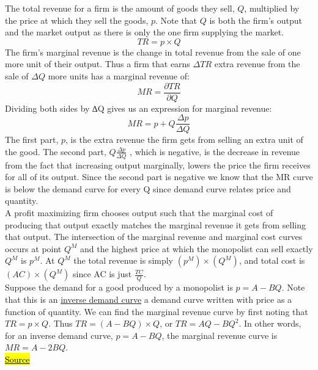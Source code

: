 \documentclass[a4paper, 12pt, reqno]{article}
\begin{document}
The total revenue for a firm is the amount of goods they sell, $Q$, multiplied by the price at which they sell the goods, $p$. Note that $Q$ is both the firm’s output and the market output as there is only the one firm supplying the market. 
$$ TR = p\times Q$$
The firm’s marginal revenue is the change in total revenue from the sale of one more unit of their output. Thus a firm that earns $\Delta TR$ extra revenue from the sale of $\Delta Q$ more units has a marginal revenue of: 
$$MR = \frac{\partial TR}{\partial Q}$$
Dividing both sides by ∆Q gives us an expression for marginal revenue:
$$MR= p+Q\frac{\Delta p}{\Delta Q}$$
The first part, $p$, is the extra revenue the firm gets from selling an extra unit of the good. The second part, $Q\frac{\Delta p}{\Delta Q}$ , which is negative, is the decrease in revenue from the fact that increasing output marginally, 
lowers the price the firm receives for all of its output. Since the second part is negative we know that the MR curve is below the demand curve for every Q since demand curve relates price and quantity. \\

A profit maximizing firm chooses output such that the marginal cost of producing that output exactly matches the marginal revenue it gets from selling that output. The intersection of the marginal revenue and marginal cost curves occurs at point $Q^M $ and the highest price at which the monopolist can sell exactly $Q^M $ is $p^M $. 
At $Q^M $ the total revenue is simply $(p^M ) \times (Q^M )$, and total cost is $(AC) \times (Q^M )$ since AC is just $\frac{TC}{Q}$. \\

Suppose the demand for a good produced by a monopolist is $p = A - BQ$. Note that this is an \underline{inverse demand curve} a demand curve written with price as a function of quantity. We can find the marginal revenue curve by first noting that $TR = p \times Q$. 
Thus $TR = (A - BQ) \times Q$, or $TR = AQ - BQ^{2}$. 
In other words, for an inverse demand curve, $p = A - BQ$, the marginal revenue curve is $MR = A - 2BQ$. \\

\href{https://open.oregonstate.education/intermediatemicroeconomics/chapter/module-15/}{\hl{Source}}
\end{document}
